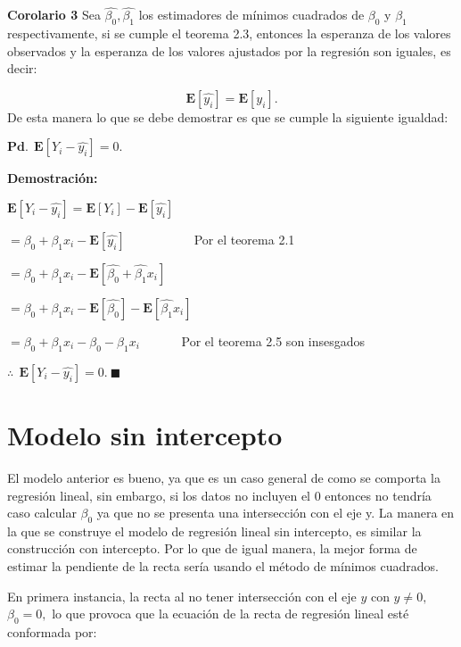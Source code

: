 \documentclass[
  a4paper,
  oneside,
  openany]{book}
\begin{document}
\textbf{Corolario 3} Sea \(\hat{\beta_{0}},\hat{\beta_{1}}\) los estimadores de mínimos cuadrados de \(\beta_{0}\) y \(\beta_{1}\) respectivamente, si se cumple el teorema 2.3, entonces la esperanza de los valores observados y la esperanza de los valores ajustados por la regresión son iguales, es decir:

\[\mathbf{E}\left[\hat{y_{i}}\right]=\mathbf{E}\left[ y_{i} \right].\]
De esta manera lo que se debe demostrar es que se cumple la siguiente igualdad:

\(\mathbf{Pd.} \ \ \mathbf{E}\left[ Y_{i}-\hat{y_{i}}\right]=0.\)

\textbf{Demostración:}

\(\mathbf{E}\left[ Y_{i}-\hat{y_{i}}\right]=\mathbf{E}\left[ Y_{i}\right]-\mathbf{E}\left[\hat{y_{i}}\right]\)

\(=\beta_{0}+\beta_{1}x_{i}-\mathbf{E}\left[\hat{y_{i}}\right]\) ~~~ ~~~ ~~~Por el teorema 2.1

\(=\beta_{0}+\beta_{1}x_{i}-\mathbf{E}\left[ \hat{\beta_{0}}+\hat{\beta_{1}}x_{i}\right]\)

\(=\beta_{0}+\beta_{1}x_{i}-\mathbf{E}\left[ \hat{\beta_{0}}\right]-\mathbf{E}\left[\hat{\beta_{1}}x_{i}\right]\)

\(=\beta_{0}+\beta_{1}x_{i}-\beta_{0}-\beta_{1}x_{i}\) ~~~~~~Por el teorema 2.5 son insesgados

\(\therefore \ \ \mathbf{E}\left[ Y_{i}-\hat{y_{i}}\right]=0.\  \blacksquare\)

\hypertarget{modelo-sin-intercepto}{%
\chapter{Modelo sin intercepto}\label{modelo-sin-intercepto}}

El modelo anterior es bueno, ya que es un caso general de como se comporta la regresión lineal, sin embargo, si los datos no incluyen el 0 entonces no tendría caso calcular \(\beta_{0}\) ya que no se presenta una intersección con el eje y.
La manera en la que se construye el modelo de regresión lineal sin intercepto, es similar la construcción con intercepto. Por lo que de igual manera, la mejor forma de estimar la pendiente de la recta sería usando el método de mínimos cuadrados.

En primera instancia, la recta al no tener intersección con el eje \(y\) con \(y \neq 0,\) \(\beta_{0}=0,\) lo que provoca que la ecuación de la recta de regresión lineal esté conformada por:
\end{document}
